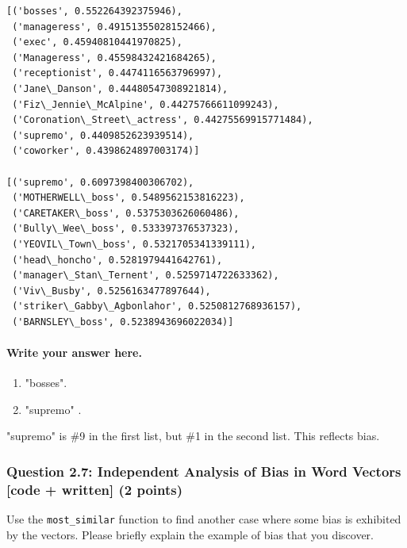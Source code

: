 \documentclass[11pt]{article}
\providecommand{\tightlist}{%
      \setlength{\itemsep}{0pt}\setlength{\parskip}{0pt}}
\begin{document}
    \begin{Verbatim}[commandchars=\\\{\}]
[('bosses', 0.552264392375946),
 ('manageress', 0.49151355028152466),
 ('exec', 0.45940810441970825),
 ('Manageress', 0.45598432421684265),
 ('receptionist', 0.4474116563796997),
 ('Jane\_Danson', 0.44480547308921814),
 ('Fiz\_Jennie\_McAlpine', 0.44275766611099243),
 ('Coronation\_Street\_actress', 0.44275569915771484),
 ('supremo', 0.4409852623939514),
 ('coworker', 0.4398624897003174)]

[('supremo', 0.6097398400306702),
 ('MOTHERWELL\_boss', 0.5489562153816223),
 ('CARETAKER\_boss', 0.5375303626060486),
 ('Bully\_Wee\_boss', 0.533397376537323),
 ('YEOVIL\_Town\_boss', 0.5321705341339111),
 ('head\_honcho', 0.5281979441642761),
 ('manager\_Stan\_Ternent', 0.5259714722633362),
 ('Viv\_Busby', 0.5256163477897644),
 ('striker\_Gabby\_Agbonlahor', 0.5250812768936157),
 ('BARNSLEY\_boss', 0.5238943696022034)]

    \end{Verbatim}

    \paragraph{Write your answer here.}\label{write-your-answer-here.}

\begin{enumerate}
\def\labelenumi{\alph{enumi}.}
\tightlist
\item
  "bosses".
\item
  "supremo" .
\end{enumerate}

"supremo" is \#9 in the first list, but \#1 in the second list. This
reflects bias.

    \subsubsection{Question 2.7: Independent Analysis of Bias in Word
Vectors {[}code + written{]} (2
points)}\label{question-2.7-independent-analysis-of-bias-in-word-vectors-code-written-2-points}

Use the \texttt{most\_similar} function to find another case where some
bias is exhibited by the vectors. Please briefly explain the example of
bias that you discover.
\end{document}
